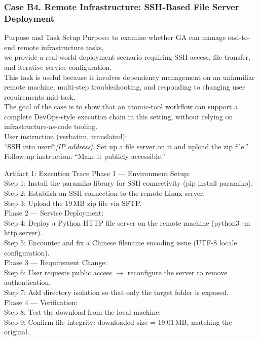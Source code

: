 \FloatBarrier

\subsubsection{Case B4. Remote Infrastructure: SSH-Based File Server Deployment}
\label{app:case_remote_infra}

\begin{CasePromptBox}{Purpose and Task Setup}
\small\ttfamily
Purpose: to examine whether GA can manage end-to-end remote infrastructure tasks, \\
we provide a real-world deployment scenario requiring SSH access, file transfer, and iterative service configuration. \\
This task is useful because it involves dependency management on an unfamiliar remote machine, multi-step troubleshooting, and responding to changing user requirements mid-task. \\
The goal of the case is to show that an atomic-tool workflow can support a complete DevOps-style execution chain in this setting, without relying on infrastructure-as-code tooling. \\[6pt]
User instruction (verbatim, translated): \\
``SSH into user@{\it [IP address]}. Set up a file server on it and upload the zip file.'' \\
Follow-up instruction: ``Make it publicly accessible.''
\end{CasePromptBox}

\begin{CaseTraceBox}{Artifact 1: Execution Trace}
\small\ttfamily
Phase 1 --- Environment Setup: \\
Step 1: Install the paramiko library for SSH connectivity (pip install paramiko). \\
Step 2: Establish an SSH connection to the remote Linux server. \\
Step 3: Upload the 19\,MB zip file via SFTP. \\[4pt]
Phase 2 --- Service Deployment: \\
Step 4: Deploy a Python HTTP file server on the remote machine (python3 -m http.server). \\
Step 5: Encounter and fix a Chinese filename encoding issue (UTF-8 locale configuration). \\[4pt]
Phase 3 --- Requirement Change: \\
Step 6: User requests public access $\rightarrow$ reconfigure the server to remove authentication. \\
Step 7: Add directory isolation so that only the target folder is exposed. \\[4pt]
Phase 4 --- Verification: \\
Step 8: Test the download from the local machine. \\
Step 9: Confirm file integrity: downloaded size = 19.01\,MB, matching the original.
\end{CaseTraceBox}

